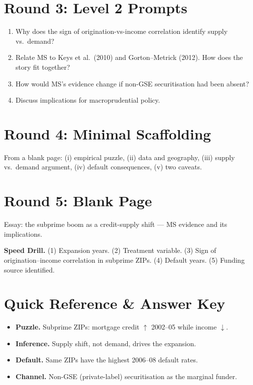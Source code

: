 \documentclass[11pt]{article}
\begin{document}
\section*{Round 3: Level 2 Prompts}
\begin{enumerate}
\item Why does the sign of origination-vs-income correlation identify supply vs.\ demand?
\item Relate MS to Keys et al.\ (2010) and Gorton--Metrick (2012). How does the story fit together?
\item How would MS's evidence change if non-GSE securitisation had been absent?
\item Discuss implications for macroprudential policy.
\end{enumerate}

\section*{Round 4: Minimal Scaffolding}
From a blank page: (i) empirical puzzle, (ii) data and geography, (iii) supply vs.\ demand argument, (iv) default consequences, (v) two caveats.

\section*{Round 5: Blank Page}
Essay: the subprime boom as a credit-supply shift --- MS evidence and its implications.

\vspace{6pt}
\begin{drillbox}
\textbf{Speed Drill.} (1) Expansion years. (2) Treatment variable. (3) Sign of origination--income correlation in subprime ZIPs. (4) Default years. (5) Funding source identified.
\end{drillbox}

\section*{Quick Reference \& Answer Key}
\begin{answerbox}
\begin{itemize}
\item \textbf{Puzzle.} Subprime ZIPs: mortgage credit $\uparrow$ 2002--05 while income $\downarrow$.
\item \textbf{Inference.} Supply shift, not demand, drives the expansion.
\item \textbf{Default.} Same ZIPs have the highest 2006--08 default rates.
\item \textbf{Channel.} Non-GSE (private-label) securitisation as the marginal funder.
\end{itemize}
\end{answerbox}
\end{document}
